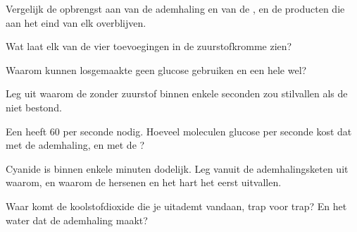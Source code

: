 \begin{exercise}[$\star$]\label{exo:g12:respiration-fermentation:5}
Vergelijk de opbrengst aan  van de ademhaling en van de , en de
producten die aan het eind van elk overblijven.
\end{exercise}

\begin{exercise}[$\star\star$]\label{exo:g12:respiration-fermentation:6}
Wat laat elk van de vier toevoegingen in de zuurstofkromme zien?
\end{exercise}

\begin{exercise}[$\star\star$]\label{exo:g12:respiration-fermentation:7}
Waarom kunnen losgemaakte  geen glucose gebruiken en een hele  wel?
\end{exercise}

\begin{exercise}[$\star\star$]\label{exo:g12:respiration-fermentation:8}
Leg uit waarom de  zonder zuurstof binnen enkele seconden zou
stilvallen als de  niet bestond.
\end{exercise}

\begin{exercise}[$\star\star$]\label{exo:g12:respiration-fermentation:9}
Een  heeft 60  per seconde nodig. Hoeveel moleculen glucose per
seconde kost dat met de ademhaling, en met de ?
\end{exercise}

\begin{exercise}[$\star\star$]\label{exo:g12:respiration-fermentation:10}
Cyanide is binnen enkele minuten dodelijk. Leg vanuit de ademhalingsketen
uit waarom, en waarom de hersenen en het hart het eerst uitvallen.
\end{exercise}

\begin{exercise}[$\star\star$]\label{exo:g12:respiration-fermentation:11}
Waar komt de koolstofdioxide die je uitademt vandaan, trap voor trap? En
het water dat de ademhaling maakt?
\end{exercise}

